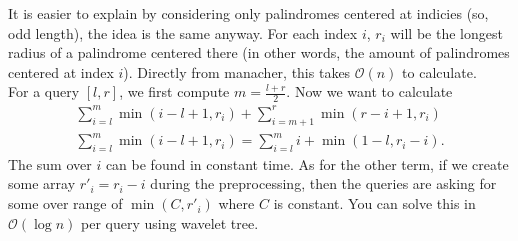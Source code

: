 {\small
{
    It is easier to explain by considering only palindromes centered at indicies (so, odd length), the idea is the same anyway. For each index $i$, $r_i$ will be the longest radius of a palindrome centered there (in other words, the amount of palindromes centered at index $i$). Directly from manacher, this takes $\mathcal{O}(n)$ to calculate. \\

For a query $[l, r]$, we first compute $m = \frac{l+r}{2}$. Now we want to calculate
\begin{align*}
    \sum_{i=l}^{m} \min(i - l + 1, r_i) + 
    \sum_{i=m+1}^{r} \min(r - i + 1, r_i) \\
    \sum_{i=l}^{m} \min(i - l + 1, r_i) =
    \sum_{i=l}^{m} i + \min(1 - l, r_i - i).
\end{align*}
The sum over $i$ can be found in constant time. As for the other term, if we create some array $r'_{i} = r_i - i$ during the preprocessing, then the queries are asking for some over range of $\min(C, r'_{i})$ where $C$ is constant. You can solve this in $\mathcal{O}(\log n)$ per query using wavelet tree.
}
}
